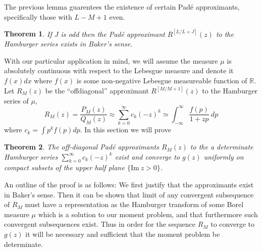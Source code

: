\documentclass{amsart}
\newtheorem{theorem}{Theorem}[section]
\theoremstyle{remark}
\numberwithin{equation}{section}
\newcommand{\tc}{\textcolor{blue}}
\newcommand{\RR}{\mathbb{R}}
\begin{document}
The previous lemma guarentees the existence of certain Pad\'e approximants, specifically those with $L-M+1$ even. 
\begin{theorem}
    If $J$ is odd then the Pad\'e approximant $R^{[L/L+J]}(z)$ to the Hamburger series exists in Baker's sense.
\end{theorem}


With our particular application in mind, we will assume the measure $\mu$ is absolutely continuous with respect to the Lebesgue measure and denote it $f(x)dx$ where $f(x)$ is some non-negative Lebesgue measureable function of $\RR$. Let $R_M(z)$ be the ``offdiagonal'' approximant $R^{[M/M+1]}(z)$ to the Hamburger series of $\mu$,
\[
    R_M(z) = \frac{P_M(z)}{Q_M(z)} \approx \sum_{k=0}^\infty c_k {(-z)}^k \simeq \int_{-\infty}^\infty \frac{f(p)}{1 + zp} ~dp
\]
where $c_k = \int p^k f(p) dp$. In this section we will prove

\begin{theorem}
    The off-diagonal Pad\'e approximants $R_M(z)$ to the a determinate Hamburger series $\sum_{k=0}^\infty c_k {(-z)}^k$ exist and converge to $g(z)$ uniformly on compact subsets of the upper half plane $\{\text{Im} ~z > 0\}$.
\end{theorem}

An outline of the proof is as follows: We first justify that the approximants exist in Baker's sense. Then it can be shown that limit of any convergent subsequence of $R_M$ must have a representation as the Hamburger transform of some Borel measure $\mu$ which is a solution to our moment problem, and that furthermore such convergent subsequences exist. Thus in order for the sequence $R_M$ to converge to $g(z)$ it will be necessary and sufficient that the moment problem be determinate.

\end{document}
